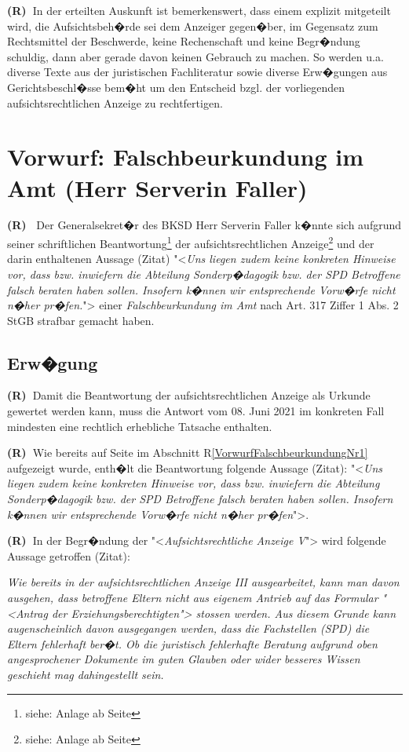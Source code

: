 \documentclass[paper=a4,fontsize=12pt, oneside, numbers=noenddot]{scrbook}
\newcounter{rz}
\newcommand{\Rz}{\addtocounter{rz}{1}\textbf{(R\arabic{rz})~}}
\newcommand{\RzLabel}[1]{\refstepcounter{rz}\label{#1}\textbf{(R\arabic{rz})~}}
\begin{document}
	\Rz In der erteilten Auskunft ist bemerkenswert, dass einem  explizit mitgeteilt wird, die Aufsichtsbeh�rde sei dem Anzeiger gegen�ber, im Gegensatz zum Rechtsmittel der Beschwerde, keine Rechenschaft und keine Begr�ndung schuldig, dann aber gerade davon keinen Gebrauch zu machen. So werden u.a. diverse Texte aus der juristischen Fachliteratur sowie diverse Erw�gungen aus Gerichtsbeschl�sse bem�ht um den Entscheid bzgl. der vorliegenden aufsichtsrechtlichen Anzeige zu rechtfertigen.
	
	
	\chapter{Vorwurf: Falschbeurkundung im Amt (Herr Serverin Faller)}
	
	\RzLabel{VorwurfFalschbeurkundungNr1} Der Generalsekret�r des BKSD Herr Serverin Faller k�nnte sich aufgrund seiner schriftlichen Beantwortung\footnote{siehe: Anlage ab Seite \pageref{EntscheidAnzeige}} der aufsichtsrechtlichen Anzeige\footnote{siehe: Anlage ab Seite \pageref{EmailAnhangAnzeige}} und der darin enthaltenen Aussage (Zitat) "<\textit{Uns liegen zudem keine konkreten Hinweise vor, dass bzw. inwiefern die Abteilung Sonderp�dagogik bzw. der SPD Betroffene falsch beraten haben sollen. Insofern k�nnen wir entsprechende Vorw�rfe nicht n�her pr�fen.}"> einer \textit{Falschbeurkundung im Amt} nach Art. 317 Ziffer 1 Abs. 2 StGB strafbar gemacht haben.
	
	
	
	\section{Erw�gung}
	
	\Rz Damit die Beantwortung der aufsichtsrechtlichen Anzeige als Urkunde gewertet werden kann, muss die Antwort vom 08. Juni 2021 im konkreten Fall mindesten eine rechtlich erhebliche Tatsache enthalten. 
	
	\Rz Wie bereits auf Seite \pageref{VorwurfFalschbeurkundungNr1} im Abschnitt R\ref{VorwurfFalschbeurkundungNr1} aufgezeigt wurde, enth�lt die Beantwortung folgende Aussage (Zitat): "<\textit{Uns liegen zudem keine konkreten Hinweise vor, dass bzw. inwiefern die Abteilung Sonderp�dagogik bzw. der SPD Betroffene falsch beraten haben sollen. Insofern k�nnen wir entsprechende Vorw�rfe nicht n�her pr�fen}">.
	
	\Rz In der Begr�ndung der "<\textit{Aufsichtsrechtliche Anzeige V}"> wird folgende Aussage getroffen (Zitat):
	\begin{addmargin}[2.5em]{0em}\emph{Wie bereits in der aufsichtsrechtlichen Anzeige III ausgearbeitet, kann man davon ausgehen, dass betroffene Eltern nicht aus eigenem Antrieb auf das Formular "<Antrag der Erziehungsberechtigten"> stossen werden. Aus diesem Grunde kann augenscheinlich davon ausgegangen werden, dass die Fachstellen (SPD) die Eltern fehlerhaft ber�t. Ob die juristisch fehlerhafte Beratung aufgrund oben angesprochener Dokumente im guten Glauben oder wider besseres Wissen geschieht mag dahingestellt sein.
	}\end{addmargin} 
	
\end{document}
